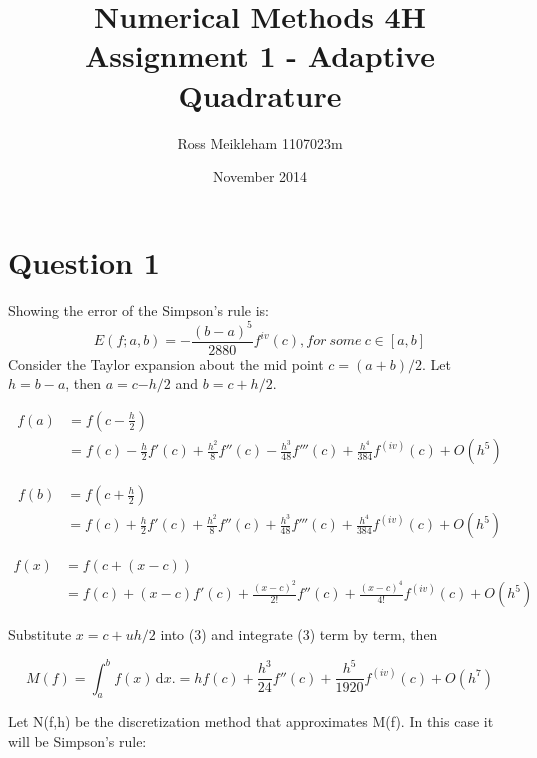 \documentclass[fleqn]{report}
\begin{document}
\title{Numerical Methods 4H Assignment 1 - Adaptive Quadrature}
\author{Ross Meikleham 1107023m}
\date{November 2014}
\maketitle

\section{Question 1}
Showing the error of the Simpson's rule is:
\begin{equation*}
E(f;a,b) = -\frac{(b-a)^5}{2880}f^{iv}(c), for\ some \ c \in [a,b]
\end{equation*}
Consider the Taylor expansion about the mid point $c = (a+b)/2$. 
Let $h =b-a$, then $a =c$$-h/2$ and $b=c+h/2$.

\begin{equation}
\begin{split}
f(a) & =f(c - \frac{h}{2})\\
& = f(c) - \frac{h}{2}f'(c) + \frac{h^2}{8}f''(c) - \frac{h^3}{48}f'''(c) + \frac{h^4}{384}f^{(iv)}(c) + O(h^5)
\end{split}
\end{equation}

\begin{equation}
\begin{split}
f(b) & =f(c + \frac{h}{2})\\
& = f(c) + \frac{h}{2}f'(c) + \frac{h^2}{8}f''(c) + \frac{h^3}{48}f'''(c) + \frac{h^4}{384}f^{(iv)}(c) + O(h^5)
\end{split}
\end{equation}

\begin{equation}
\begin{split}
f(x) & =f(c + (x - c))\\
& = f(c) + (x - c)f'(c) + \frac{(x-c)^2}{2!}f''(c) + \frac{(x-c)^4}{4!}f^{(iv)}(c) + O(h^5) 
\end{split}
\end{equation}

Substitute $x=c+uh/2$ into (3) and integrate (3) term by term, then

\begin{equation*}
M(f) = \int_a^b \! f(x) \, \mathrm{d}x. 
= hf(c) + \frac{h^3}{24}f''(c) + \frac{h^5}{1920}f^{(iv)}(c) + O(h^7)
\end{equation*}

Let N(f,h) be the discretization method that approximates M(f). In this case it will be Simpson's rule:
\end{document}
